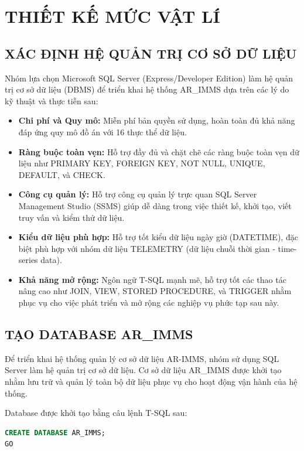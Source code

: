 \chapter{THIẾT KẾ MỨC VẬT LÍ}
\label{chap:trien_khai_csdl}

\section{XÁC ĐỊNH HỆ QUẢN TRỊ CƠ SỞ DỮ LIỆU}
Nhóm lựa chọn Microsoft SQL Server (Express/Developer Edition) làm hệ quản trị cơ sở dữ liệu (DBMS) để triển khai hệ thống AR\_IMMS dựa trên các lý do kỹ thuật và thực tiễn sau:

\begin{itemize}
    \item \textbf{Chi phí và Quy mô:} Miễn phí bản quyền sử dụng, hoàn toàn đủ khả năng đáp ứng quy mô đồ án với 16 thực thể dữ liệu.
    \item \textbf{Ràng buộc toàn vẹn:} Hỗ trợ đầy đủ và chặt chẽ các ràng buộc toàn vẹn dữ liệu như PRIMARY KEY, FOREIGN KEY, NOT NULL, UNIQUE, DEFAULT, và CHECK.
    \item \textbf{Công cụ quản lý:} Hỗ trợ công cụ quản lý trực quan SQL Server Management Studio (SSMS) giúp dễ dàng trong việc thiết kế, khởi tạo, viết truy vấn và kiểm thử dữ liệu.
    \item \textbf{Kiểu dữ liệu phù hợp:} Hỗ trợ tốt kiểu dữ liệu ngày giờ (DATETIME), đặc biệt phù hợp với nhóm dữ liệu TELEMETRY (dữ liệu chuỗi thời gian - time-series data).
    \item \textbf{Khả năng mở rộng:} Ngôn ngữ T-SQL mạnh mẽ, hỗ trợ tốt các thao tác nâng cao như JOIN, VIEW, STORED PROCEDURE, và TRIGGER nhằm phục vụ cho việc phát triển và mở rộng các nghiệp vụ phức tạp sau này.
\end{itemize}

\section{TẠO DATABASE AR\_IMMS}
Để triển khai hệ thống quản lý cơ sở dữ liệu AR-IMMS, nhóm sử dụng SQL Server làm hệ quản trị cơ sở dữ liệu. Cơ sở dữ liệu AR\_IMMS được khởi tạo nhằm lưu trữ và quản lý toàn bộ dữ liệu phục vụ cho hoạt động vận hành của hệ thống.

Database được khởi tạo bằng câu lệnh T-SQL sau:

\begin{lstlisting}[language=SQL]
CREATE DATABASE AR_IMMS;
GO
\end{lstlisting}


